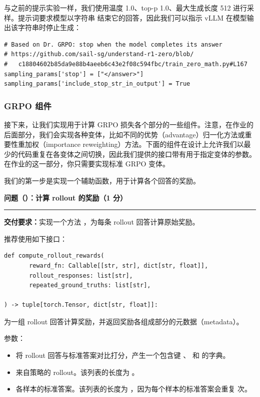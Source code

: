 与之前的提示实验一样，我们使用温度 1.0、top-p 1.0、最大生成长度 512 进行采样。提示词要求模型以字符串  结束它的回答，因此我们可以指示 vLLM 在模型输出该字符串时停止生成：

\begin{lstlisting}
# Based on Dr. GRPO: stop when the model completes its answer
# https://github.com/sail-sg/understand-r1-zero/blob/
#   c18804602b85da9e88b4aeeb6c43e2f08c594fbc/train_zero_math.py#L167
sampling_params['stop'] = ["</answer>"]
sampling_params['include_stop_str_in_output'] = True
\end{lstlisting}

\subsubsection{GRPO 组件}

接下来，让我们实现用于计算 GRPO 损失各个部分的一些组件。注意，在作业的后面部分，我们会实现各种变体，比如不同的优势（advantage）归一化方法或重要性重加权（importance reweighting）方法。下面的组件在设计上允许我们以最少的代码重复在各变体之间切换，因此我们提供的接口带有用于指定变体的参数。在作业的这一部分，你只需要实现标准 GRPO 变体。

我们的第一步是实现一个辅助函数，用于计算各个回答的奖励。

\medskip
\noindent\textbf{问题（）：计算 rollout 的奖励（1 分）}
\par\nobreak\smallskip\hrule\nobreak\medskip

\textbf{交付要求：}实现一个方法 ，为每条 rollout 回答计算原始奖励。

推荐使用如下接口：

\begin{lstlisting}
def compute_rollout_rewards(
       reward_fn: Callable[[str, str], dict[str, float]],
       rollout_responses: list[str],
       repeated_ground_truths: list[str],

) -> tuple[torch.Tensor, dict[str, float]]:
\end{lstlisting}

为一组 rollout 回答计算奖励，并返回奖励各组成部分的元数据（metadata）。

参数：

\begin{itemize}
  \item {} 将 rollout 回答与标准答案对比打分，产生一个包含键 、 和  的字典。
  \item {} 来自策略的 rollout。该列表的长度为 。
  \item {} 各样本的标准答案。该列表的长度为 ，因为每个样本的标准答案会重复  次。
\end{itemize}

